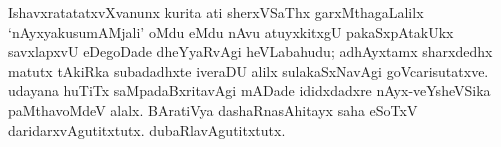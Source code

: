 IshavxratatatxvXvanunx kurita ati sherxVSaThx garxMthagaLalilx `nAyxyakusumAMjali' oMdu eMdu nAvu atuyxkitxgU pakaSxpAtakUkx savxlapxvU eDegoDade dheYyaRvAgi heVLabahudu; adhAyxtamx sharxdedhx matutx tAkiRka subadadhxte iveraDU alilx sulakaSxNavAgi goVcarisutatxve. udayana huTiTx saMpadaBxritavAgi mADade ididxdadxre nAyx-veYsheVSika paMthavoMdeV alalx. BAratiVya dashaRnasAhitayx saha eSoTxV daridarxvAgutitxtutx. dubaRlavAgutitxtutx.

\theendnotes










